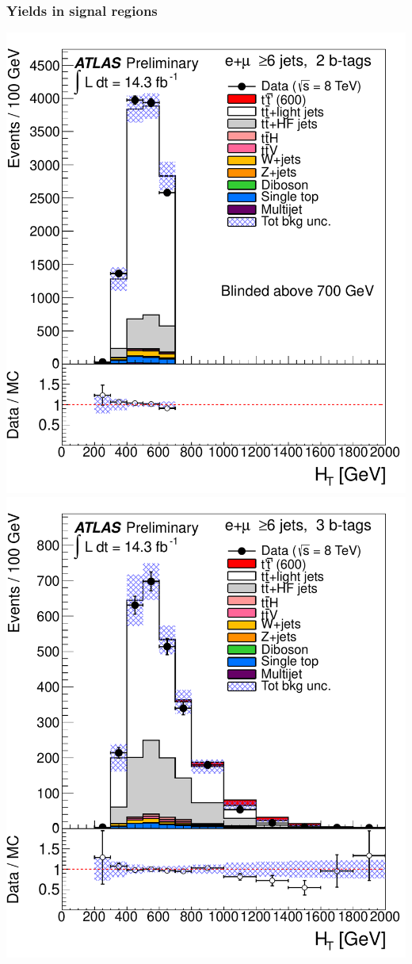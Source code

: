 \begin{frame}\frametitle{Yields in signal regions}
\centering\scriptsize

\myskip
\begin{minipage}{.5\textwidth}\centering

\includegraphics[width=.5\textwidth]{pics/htx_final/HTAll_6jetin2btagex_ELEMUON.pdf}
\includegraphics[width=.5\textwidth]{pics/htx_final/HTAll_6jetin3btagex_ELEMUON.pdf}


\end{minipage}
\end{frame}
